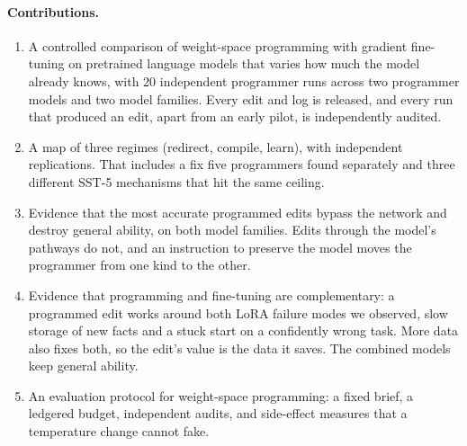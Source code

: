 \paragraph{Contributions.}
\begin{enumerate}
  \item A controlled comparison of weight-space programming with gradient fine-tuning on pretrained language models that varies how much the model already knows, with 20 independent programmer runs across two programmer models and two model families. Every edit and log is released, and every run that produced an edit, apart from an early pilot, is independently audited.
  \item A map of three regimes (redirect, compile, learn), with independent replications. That includes a fix five programmers found separately and three different SST-5 mechanisms that hit the same ceiling.
  \item Evidence that the most accurate programmed edits bypass the network and destroy general ability, on both model families. Edits through the model's pathways do not, and an instruction to preserve the model moves the programmer from one kind to the other.
  \item Evidence that programming and fine-tuning are complementary: a programmed edit works around both LoRA failure modes we observed, slow storage of new facts and a stuck start on a confidently wrong task. More data also fixes both, so the edit's value is the data it saves. The combined models keep general ability.
  \item An evaluation protocol for weight-space programming: a fixed brief, a ledgered budget, independent audits, and side-effect measures that a temperature change cannot fake.
\end{enumerate}
